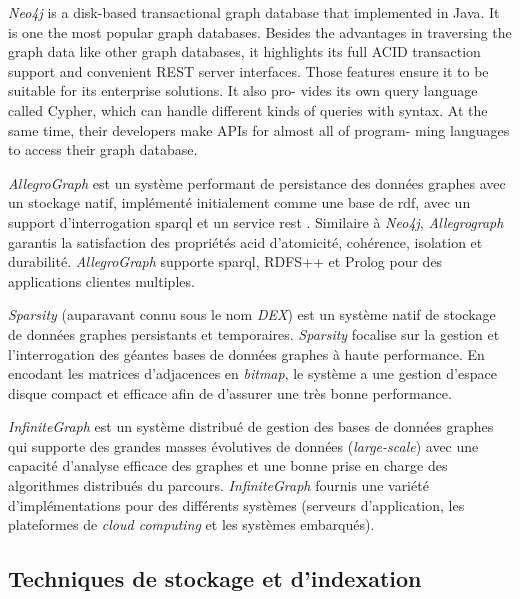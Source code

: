     \emph{Neo4j} \cite{neo4j} is a disk-based transactional graph
    database that implemented in Java. It is one the most popular
    graph databases. Besides the advantages in traversing the graph
    data like other graph databases, it highlights its full ACID
    transaction support and convenient REST server interfaces. Those
    features ensure it to be suitable for its enterprise solutions. It
    also pro- vides its own query language called Cypher, which can
    handle different kinds of queries with syntax. At the same time,
    their developers make APIs for almost all of program- ming
    languages to access their graph database.

    \emph{AllegroGraph} \cite{allegrograph} est un système performant
    de persistance des données graphes avec un stockage natif,
    implémenté initialement comme une base de \acrshort{rdf}, avec un
    support d'interrogation \acrshort{sparql} et un service
    \acrshort{rest} \cite{fielding2000architectural}. Similaire à
    \emph{Neo4j}, \emph{Allegrograph} garantis la satisfaction des
    propriétés \acrshort{acid} d'atomicité, cohérence, isolation et
    durabilité. \emph{AllegroGraph} supporte \acrshort{sparql}, RDFS++
    et Prolog pour des applications clientes multiples.

    \emph{Sparsity} \cite{sparksee} (auparavant connu sous le nom
    \emph{DEX}) est un système natif de stockage de données graphes
    persistants et temporaires. \emph{Sparsity} focalise sur la
    gestion et l'interrogation des géantes bases de données graphes à
    haute performance. En encodant les matrices d'adjacences en
    \emph{bitmap}, le système a une gestion d'espace disque compact et
    efficace afin de d'assurer une très bonne performance.

    \emph{InfiniteGraph} \cite{infinitegraph} est un système distribué
    de gestion des bases de données graphes qui supporte des grandes
    masses évolutives de données (\emph{large-scale}) avec une
    capacité d'analyse efficace des graphes et une bonne prise en
    charge des algorithmes distribués du parcours. \emph{InfiniteGraph}
    fournis une variété d'implémentations pour des différents systèmes
    (serveurs d'application, les plateformes de \emph{cloud computing}
    et les systèmes embarqués).

    \subsection{Techniques de stockage et d'indexation}
    \label{sec:graph-internals}

